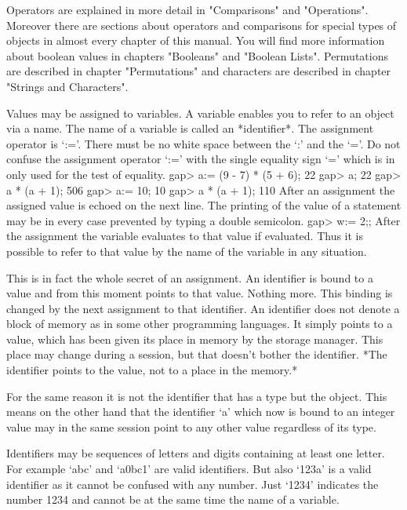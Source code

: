Operators are explained in more detail in "Comparisons" and "Operations".
Moreover there are  sections about operators  and comparisons for special
types  of  objects in almost every chapter of this manual.  You will find
more information about boolean values in chapters "Booleans" and "Boolean
Lists".   Permutations  are   described  in  chapter  "Permutations"  and
characters are described in chapter "Strings and Characters".

\null

%
Values may be assigned to variables.  A variable enables  you to refer to
an object via a name. The name of a variable is called an *identifier*.
%
The assignment operator is  `:='.   There must  be no white space between
the `:' and the  `='.  Do  not confuse the assignment operator  `:=' with
the single equality sign `=' which is in {\GAP} only used for the test of
equality.
\beginexample
    gap> a:= (9 - 7) * (5 + 6);
    22
    gap> a;
    22
    gap> a * (a + 1);
    506
    gap> a:= 10;
    10
    gap> a * (a + 1);
    110 
\endexample
After an  assignment the assigned value is echoed on the next  line.  The
printing of the value of  a statement  may be in every case prevented  by
typing a double semicolon.
\beginexample
    gap> w:= 2;; 
\endexample
After the  assignment the variable evaluates to that  value if evaluated.
Thus it is possible to refer to that value by the name of the variable in
any situation.

This is in fact the whole secret of an assignment. An identifier is bound
to a value and from this moment points  to that value. Nothing more. This
binding is   changed  by  the  next  assignment to   that  identifier. An
identifier does not denote a block of memory as in some other programming
languages. It simply points to a value, which has been given its place in
memory  by the  {\GAP} storage manager.  This place  may change  during a
{\GAP} session,  but that doesn't bother  the identifier. *The identifier
points to the value, not to a place in the memory.*

For the same  reason  it  is  not the identifier that has a  type but the
object.   This means on  the other hand that the identifier `a' which now
is bound to an  integer value may in the  same session point to any other
value regardless of its type.

Identifiers  may be sequences  of letters and digits containing at  least
one letter.   For example  `abc' and `a0bc1'  are valid identifiers.  But
also `123a'  is  a valid identifier as  it cannot be  confused  with  any
number.  Just `1234' indicates the  number 1234 and cannot be at the same
time the name of a variable.

